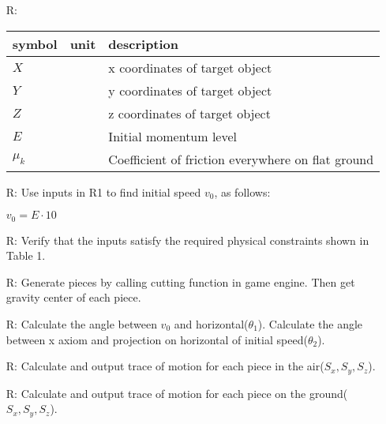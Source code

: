 \documentclass[12pt]{article}
\newcounter{reqnum} %
\begin{document}
\noindent \begin{itemize}

\item[R\refstepcounter{reqnum}\thereqnum \label{R_Inputs}:] 

	\noindent \begin{longtable*}{l l l} 
		\toprule
		\textbf{symbol} & \textbf{unit} & \textbf{description}\\
		\midrule 
		$X$ & & x coordinates of target object
		\\
		$Y$ & & y coordinates of target object
		\\
		$Z$ & & z coordinates of target object
		\\
		$E$ & & Initial momentum level
		\\
		$\mu_{k}$ & & Coefficient of friction everywhere on flat ground
		\\
		\bottomrule
	\end{longtable*}

\item[R\refstepcounter{reqnum}\thereqnum \label{R_OutputInputs}:] Use inputs in R1 to find initial speed $v_{0}$, as follows:

$v_{0}=E \cdot 10$

\item[R\refstepcounter{reqnum}\thereqnum \label{R_VerifyOutput}:] Verify that the inputs satisfy the required physical constraints shown in Table 1.

\item[R\refstepcounter{reqnum}\thereqnum \label{R_piece}:] Generate pieces by calling cutting function in game engine. Then get gravity center of each piece.

\item[R\refstepcounter{reqnum}\thereqnum \label{R_Calculate}:]
  Calculate the angle between $v_{0}$ and horizontal($\theta _{1}$). Calculate the angle between x axiom and projection on horizontal of initial speed($\theta _{2}$).

\item[R\refstepcounter{reqnum}\thereqnum \label{R_Output1}:] 
  Calculate and output trace of motion for each piece in the air($S_{x},S_{y},S_{z}$).
  
\item[R\refstepcounter{reqnum}\thereqnum \label{R_Output2}:] 
  Calculate and output trace of motion for each piece on the ground($S_{x},S_{y},S_{z}$).

\end{itemize}
\end{document}
